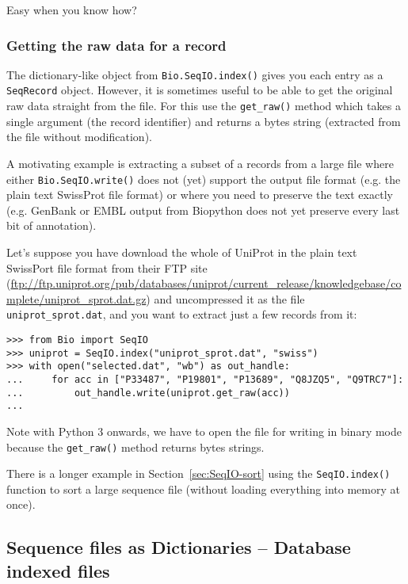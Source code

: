 \noindent Easy when you know how?

\subsubsection{Getting the raw data for a record}
\label{sec:seqio-index-getraw}

The dictionary-like object from \verb|Bio.SeqIO.index()| gives you each
entry as a \verb|SeqRecord| object. However, it is sometimes useful to
be able to get the original raw data straight from the file. For this
use the \verb|get_raw()| method which takes a
single argument (the record identifier) and returns a bytes string
(extracted from the file without modification).

A motivating example is extracting a subset of a records from a large
file where either \verb|Bio.SeqIO.write()| does not (yet) support the
output file format (e.g. the plain text SwissProt file format) or
where you need to preserve the text exactly (e.g. GenBank or EMBL
output from Biopython does not yet preserve every last bit of
annotation).

Let's suppose you have download the whole of UniProt in the plain
text SwissPort file format from their FTP site
(\url{ftp://ftp.uniprot.org/pub/databases/uniprot/current_release/knowledgebase/complete/uniprot_sprot.dat.gz})
and uncompressed it as the file \verb|uniprot_sprot.dat|, and you
want to extract just a few records from it:

\begin{verbatim}
>>> from Bio import SeqIO
>>> uniprot = SeqIO.index("uniprot_sprot.dat", "swiss")
>>> with open("selected.dat", "wb") as out_handle:
...     for acc in ["P33487", "P19801", "P13689", "Q8JZQ5", "Q9TRC7"]:
...         out_handle.write(uniprot.get_raw(acc))
...
\end{verbatim}

Note with Python 3 onwards, we have to open the file for writing in
binary mode because the \verb|get_raw()| method returns bytes strings.

There is a longer example in Section~\ref{sec:SeqIO-sort} using the
\verb|SeqIO.index()| function to sort a large sequence file (without
loading everything into memory at once).

\subsection{Sequence files as Dictionaries -- Database indexed files}
\label{sec:SeqIO-index-db}

